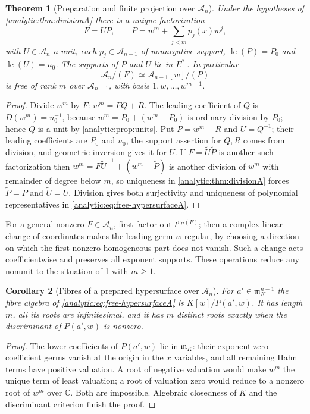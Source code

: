 \documentclass[11pt,letterpaper]{article}
\newtheorem{theorem}{Theorem}[section]
\newtheorem{corollary}[theorem]{Corollary}
\theoremstyle{definition}
\theoremstyle{remark}
\newcommand{\C}{\mathbb C}
\newcommand{\A}{\mathscr A}
\newcommand{\m}{\mathfrak m}
\newcommand{\lc}{\operatorname{lc}}
\newcommand{\vH}{v_{\!H}}
\numberwithin{equation}{section}
\begin{document}
\begin{theorem}[Preparation and finite projection over $\A_n$]
\label{analytic:thm:prepA}
Under the hypotheses of \cref{analytic:thm:divisionA} there is a unique
factorization
\begin{equation}\label{analytic:eq:prepA}
 F=UP,\qquad P=w^m+\sum_{j<m}p_j(x)w^j,
\end{equation}
with $U\in\A_n$ a unit, each $p_j\in\A_{n-1}$ of nonnegative support,
$\lc(P)=P_0$ and $\lc(U)=u_0$. The supports of $P$ and $U$ lie in $E_+^*$.
In particular
\begin{equation}\label{analytic:eq:free-hypersurfaceA}
 \A_n/(F)\simeq\A_{n-1}[w]/(P)
\end{equation}
is free of rank $m$ over $\A_{n-1}$, with basis $1,w,\ldots,w^{m-1}$.
\end{theorem}
\begin{proof}
Divide $w^m$ by $F$: $w^m=FQ+R$. The leading coefficient of $Q$ is
$D(w^m)=u_0^{-1}$, because $w^m=P_0+(w^m-P_0)$ is ordinary division by
$P_0$; hence $Q$ is a unit by \cref{analytic:prop:units}. Put $P=w^m-R$ and
$U=Q^{-1}$; their leading coefficients are $P_0$ and $u_0$, the support
assertion for $Q,R$ comes from division, and geometric inversion gives it
for $U$. If $F=\widetilde U\widetilde P$ is another such factorization then
$w^m=F\widetilde U^{-1}+(w^m-\widetilde P)$ is another division of $w^m$
with remainder of degree below $m$, so uniqueness in
\cref{analytic:thm:divisionA} forces $\widetilde P=P$ and
$\widetilde U=U$. Division gives both surjectivity and uniqueness of
polynomial representatives in
\eqref{analytic:eq:free-hypersurfaceA}.
\end{proof}

For a general nonzero $F\in\A_n$, first factor out $t^{\vH(F)}$; then a
complex-linear change of coordinates makes the leading germ $w$-regular,
by choosing a direction on which the first nonzero homogeneous part does not
vanish. Such a change acts coefficientwise and preserves all exponent
supports. These operations reduce any nonunit to the situation of
\cref{analytic:thm:prepA} with $m\ge1$.

\begin{corollary}[Fibres of a prepared hypersurface over $\A_n$]
\label{analytic:cor:hypersurface-fiber}
For $a'\in\m_K^{n-1}$ the fibre algebra of
\eqref{analytic:eq:free-hypersurfaceA} is $K[w]/P(a',w)$. It has length $m$,
all its roots are infinitesimal, and it has $m$ distinct roots exactly when
the discriminant of $P(a',w)$ is nonzero.
\end{corollary}
\begin{proof}
The lower coefficients of $P(a',w)$ lie in $\m_K$: their exponent-zero
coefficient germs vanish at the origin in the $x$ variables, and all
remaining Hahn terms have positive valuation. A root of negative valuation
would make $w^m$ the unique term of least valuation; a root of valuation
zero would reduce to a nonzero root of $w^m$ over $\C$. Both are
impossible. Algebraic closedness of $K$ and the discriminant criterion
finish the proof.
\end{proof}
\end{document}
